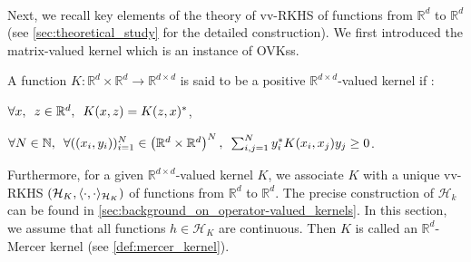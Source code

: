 \paragraph{}
Next, we recall key elements of the theory of \ac{vv-RKHS} of functions from
$\mathbb{R}^d$ to $\mathbb{R}^d$ (see \cref{sec:theoretical_study} for the
detailed construction). We first introduced the matrix-valued kernel which
is an instance of \acsp{OVK}s.
\begin{definition}  A function
    $K:\mathbb{R}^d\times\mathbb{R}^d\to\mathbb{R}^{d\times d}$ is said to be a
    positive $\mathbb{R}^{d\times d}$-valued kernel  if :
    \begin{propenum}
        \item $\forall x,\enskip z \in\mathbb{R}^d,\enskip K(x, z)= K(z,
        x)^*$, \item $\forall N \in \mathbb{N},\enskip \forall ((x_i,
        y_i))_{i=1}^N\in\left(\mathbb{R}^d\times\mathbb{R}^d\right)^N,\enskip
        \sum_{i,j=1}^N y_i^* K(x_i, x_j)y_j \geq  0$.
    \end{propenum}
\end{definition}
Furthermore, for a given $\mathbb{R}^{d\times d}$-valued kernel $K$, we
associate $K$ with a unique \acs{vv-RKHS}
$(\mathcal{H}_K,\langle\cdot,\cdot\rangle_{\mathcal{H}_K})$ of functions from
$\mathbb{R}^d$ to $\mathbb{R}^d$. The precise construction of $\mathcal{H}_k$
can be found in \cref{sec:background_on_operator-valued_kernels}. In this
section, we assume that all functions $h\in\mathcal{H}_K$ are continuous. Then
$K$ is called an $\mathbb{R}^d$-Mercer kernel (see \cref{def:mercer_kernel}).
